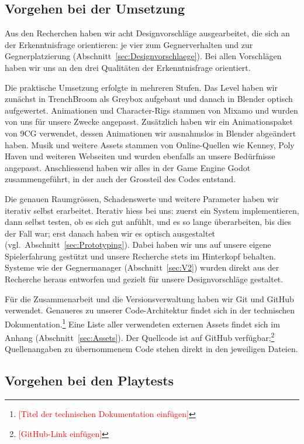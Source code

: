 \documentclass[../Main.tex]{subfiles}
\begin{document}
\subsection{Vorgehen bei der Umsetzung} \label{sec:VorgehenUmsetzung}
Aus den Recherchen haben wir acht Designvorschläge ausgearbeitet, die sich an der Erkenntnisfrage orientieren: je vier zum Gegnerverhalten und zur Gegnerplatzierung (Abschnitt~\ref{sec:Designvorschlaege}). Bei allen Vorschlägen haben wir uns an den drei Qualitäten der Erkenntnisfrage orientiert.

Die praktische Umsetzung erfolgte in mehreren Stufen. Das Level haben wir zunächst in TrenchBroom als Greybox aufgebaut und danach in Blender optisch aufgewertet. Animationen und Character-Rigs stammen von Mixamo und wurden von uns für unsere Zwecke angepasst. Zusätzlich haben wir ein Animationspaket von 9CG verwendet, dessen Animationen wir ausnahmslos in Blender abgeändert haben. Musik und weitere Assets stammen von Online-Quellen wie Kenney, Poly Haven und weiteren Webseiten und wurden ebenfalls an unsere Bedürfnisse angepasst. Anschliessend haben wir alles in der Game Engine Godot zusammengeführt, in der auch der Grossteil des Codes entstand.

Die genauen Raumgrössen, Schadenswerte und weitere Parameter haben wir iterativ selbst erarbeitet. Iterativ hiess bei uns: zuerst ein System implementieren, dann selbst testen, ob es sich gut anfühlt, und es so lange überarbeiten, bis dies der Fall war; erst danach haben wir es optisch ausgestaltet (vgl.\ Abschnitt~\ref{sec:Prototyping}). Dabei haben wir uns auf unsere eigene Spielerfahrung gestützt und unsere Recherche stets im Hinterkopf behalten. Systeme wie der Gegnermanager (Abschnitt~\ref{sec:V2}) wurden direkt aus der Recherche heraus entworfen und gezielt für unsere Designvorschläge gestaltet.

Für die Zusammenarbeit und die Versionsverwaltung haben wir Git und GitHub verwendet. Genaueres zu unserer Code-Architektur findet sich in der technischen Dokumentation.\footnote{\textcolor{red}{[Titel der technischen Dokumentation einfügen]}} Eine Liste aller verwendeten externen Assets findet sich im Anhang (Abschnitt~\ref{sec:Assets}). Der Quellcode ist auf GitHub verfügbar;\footnote{\textcolor{red}{[GitHub-Link einfügen]}} Quellenangaben zu übernommenem Code stehen direkt in den jeweiligen Dateien.

\subsection{Vorgehen bei den Playtests} \label{sec:VorgehenPlaytest}
\end{document}
